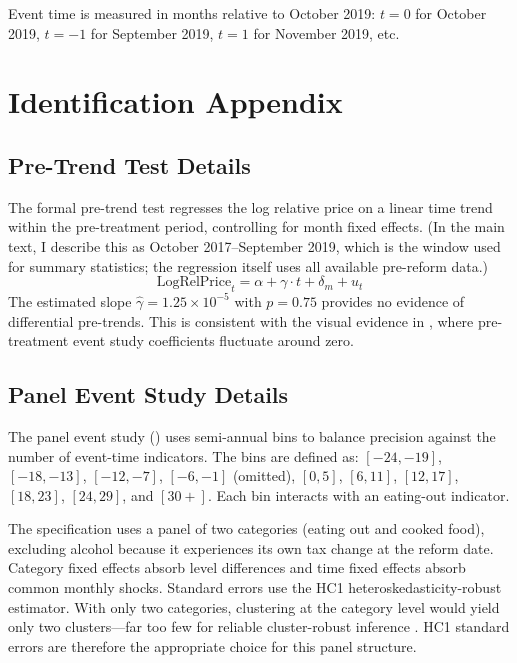 \documentclass[12pt]{article}
\begin{document}
Event time is measured in months relative to October 2019: $t = 0$ for October 2019, $t = -1$ for September 2019, $t = 1$ for November 2019, etc.


\section{Identification Appendix}
\label{app:identification}

\subsection{Pre-Trend Test Details}

The formal pre-trend test regresses the log relative price on a linear time trend within the pre-treatment period, controlling for month fixed effects. (In the main text, I describe this as October 2017--September 2019, which is the window used for summary statistics; the regression itself uses all available pre-reform data.)
\begin{equation}
\text{LogRelPrice}_t = \alpha + \gamma \cdot t + \delta_m + u_t
\end{equation}
The estimated slope $\hat{\gamma} = 1.25 \times 10^{-5}$ with $p = 0.75$ provides no evidence of differential pre-trends. This is consistent with the visual evidence in , where pre-treatment event study coefficients fluctuate around zero.

\subsection{Panel Event Study Details}

The panel event study () uses semi-annual bins to balance precision against the number of event-time indicators. The bins are defined as: $[-24, -19]$, $[-18, -13]$, $[-12, -7]$, $[-6, -1]$ (omitted), $[0, 5]$, $[6, 11]$, $[12, 17]$, $[18, 23]$, $[24, 29]$, and $[30+]$. Each bin interacts with an eating-out indicator.

The specification uses a panel of two categories (eating out and cooked food), excluding alcohol because it experiences its own tax change at the reform date. Category fixed effects absorb level differences and time fixed effects absorb common monthly shocks. Standard errors use the HC1 heteroskedasticity-robust estimator. With only two categories, clustering at the category level would yield only two clusters---far too few for reliable cluster-robust inference \citep{cameron2008bootstrap}. HC1 standard errors are therefore the appropriate choice for this panel structure.
\end{document}
